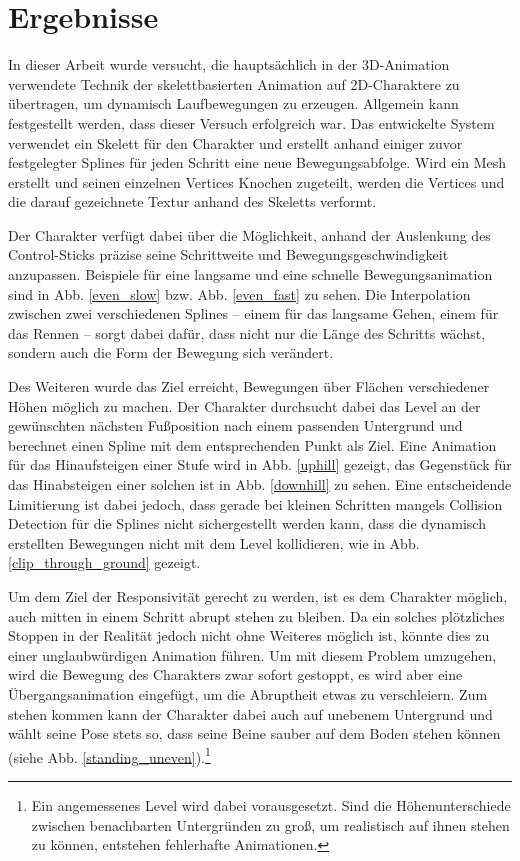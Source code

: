 \chapter{Ergebnisse} \label{ergebnisse}
In dieser Arbeit wurde versucht, die hauptsächlich in der 3D-Animation verwendete Technik der skelettbasierten Animation auf 2D-Charaktere zu übertragen, um dynamisch Laufbewegungen zu erzeugen. Allgemein kann festgestellt werden, dass dieser Versuch erfolgreich war. Das entwickelte System verwendet ein Skelett für den Charakter und erstellt anhand einiger zuvor festgelegter Splines für jeden Schritt eine neue Bewegungsabfolge. Wird ein Mesh erstellt und seinen einzelnen Vertices Knochen zugeteilt, werden die Vertices und die darauf gezeichnete Textur anhand des Skeletts verformt.

Der Charakter verfügt dabei über die Möglichkeit, anhand der Auslenkung des Control-Sticks präzise seine Schrittweite und Bewegungsgeschwindigkeit anzupassen. Beispiele für eine langsame und eine schnelle Bewegungsanimation sind in Abb. \ref{even_slow} bzw. Abb. \ref{even_fast} zu sehen. Die Interpolation zwischen zwei verschiedenen Splines -- einem für das langsame Gehen, einem für das Rennen -- sorgt dabei dafür, dass nicht nur die Länge des Schritts wächst, sondern auch die Form der Bewegung sich verändert.

Des Weiteren wurde das Ziel erreicht, Bewegungen über Flächen verschiedener Höhen möglich zu machen. Der Charakter durchsucht dabei das Level an der gewünschten nächsten Fußposition nach einem passenden Untergrund und berechnet einen Spline mit dem entsprechenden Punkt als Ziel. Eine Animation für das Hinaufsteigen einer Stufe wird in Abb. \ref{uphill} gezeigt, das Gegenstück für das Hinabsteigen einer solchen ist in Abb. \ref{downhill} zu sehen. Eine entscheidende Limitierung ist dabei jedoch, dass gerade bei kleinen Schritten mangels Collision Detection für die Splines nicht sichergestellt werden kann, dass die dynamisch erstellten Bewegungen nicht mit dem Level kollidieren, wie in Abb. \ref{clip_through_ground} gezeigt.

Um dem Ziel der Responsivität gerecht zu werden, ist es dem Charakter möglich, auch mitten in einem Schritt abrupt stehen zu bleiben. Da ein solches plötzliches Stoppen in der Realität jedoch nicht ohne Weiteres möglich ist, könnte dies zu einer unglaubwürdigen Animation führen. Um mit diesem Problem umzugehen, wird die Bewegung des Charakters zwar sofort gestoppt, es wird aber eine Übergangsanimation eingefügt, um die Abruptheit etwas zu verschleiern. Zum stehen kommen kann der Charakter dabei auch auf unebenem Untergrund und wählt seine Pose stets so, dass seine Beine sauber auf dem Boden stehen können (siehe Abb. \ref{standing_uneven}).\footnote{Ein angemessenes Level wird dabei vorausgesetzt. Sind die Höhenunterschiede zwischen benachbarten Untergründen zu groß, um realistisch auf ihnen stehen zu können, entstehen fehlerhafte Animationen.}

